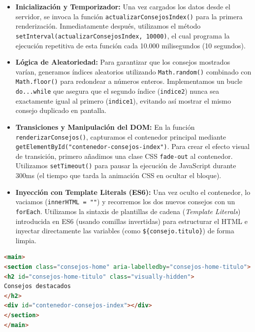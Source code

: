 \documentclass[11pt]{article}
\begin{document}
\begin{itemize}
\item \textbf{Inicialización y Temporizador:} Una vez cargados los datos desde el servidor, se invoca la función \texttt{actualizarConsejosIndex()} para la primera renderización. Inmediatamente después, utilizamos el método \texttt{setInterval(actualizarConsejosIndex, 10000)}, el cual programa la ejecución repetitiva de esta función cada 10.000 milisegundos (10 segundos).
\item \textbf{Lógica de Aleatoriedad:} Para garantizar que los consejos mostrados varían, generamos índices aleatorios utilizando \texttt{Math.random()} combinado con \texttt{Math.floor()} para redondear a números enteros. Implementamos un bucle \texttt{do...while} que asegura que el segundo índice (\texttt{indice2}) nunca sea exactamente igual al primero (\texttt{indice1}), evitando así mostrar el mismo consejo duplicado en pantalla.
\item \textbf{Transiciones y Manipulación del DOM:} En la función \texttt{renderizarConsejos()}, capturamos el contenedor principal mediante \texttt{getElementById("contenedor-consejos-index")}. Para crear el efecto visual de transición, primero añadimos una clase CSS \texttt{fade-out} al contenedor. Utilizamos \texttt{setTimeout()} para pausar la ejecución de JavaScript durante 300ms (el tiempo que tarda la animación CSS en ocultar el bloque).
\item \textbf{Inyección con Template Literals (ES6):} Una vez oculto el contenedor, lo vaciamos (\texttt{innerHTML = ""}) y recorremos los dos nuevos consejos con un \texttt{forEach}. Utilizamos la sintaxis de plantillas de cadena (\textit{Template Literals}) introducida en ES6 (usando comillas invertidas) para estructurar el HTML e inyectar directamente las variables (como \texttt{\$\{consejo.titulo\}}) de forma limpia.
\end{itemize}

\begin{lstlisting}[language=HTML, caption=Contenedor HTML preparado para la inyección dinámica]
<main>
<section class="consejos-home" aria-labelledby="consejos-home-titulo">
<h2 id="consejos-home-titulo" class="visually-hidden">
Consejos destacados
</h2>
<div id="contenedor-consejos-index"></div>
</section>
</main>
\end{lstlisting}
\end{document}
